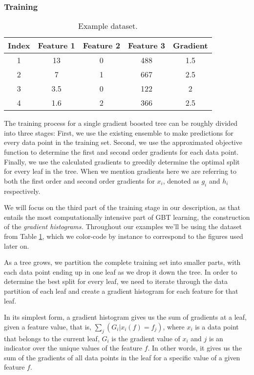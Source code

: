 \subsubsection*{Training}

\begin{table}
	\centering
	\begin{tabular}{cccc|c}
		\toprule
		Index & Feature 1 & Feature 2 & Feature 3 & Gradient \\
		\midrule
		\rowcolor{CBOne}
		1 & 13 & 0 & 488 & 1.5 \\
		\rowcolor{CBTwo}
		2 & 7 & 1 & 667 & 2.5 \\
		\rowcolor{CBThree}
		3 & 3.5 & 0 & 122 & 2 \\
		\rowcolor{CBFour}
		4 & 1.6 & 2 & 366 & 2.5 \\
		\bottomrule
	\end{tabular}
	\caption{Example dataset.}
	\label{tab:example-data}
\end{table}


The training process for a single gradient boosted tree can be roughly divided into three stages:
First, we use the existing ensemble to make predictions for every data point in the training
set. Second, we use the approximated objective function to determine the first and second order
gradients for each data point. Finally, we use the calculated gradients to greedily determine
the optimal split for every leaf in the tree. When we mention gradients here we are referring
to both the first order and second order gradients for $x_i$, denoted as $g_i$ and $h_i$
respectively.

We will focus on the third part of the training stage in our description, as that entails the most
computationally intensive part of GBT learning, the construction of the \emph{gradient histograms.}
Throughout our examples we'll be using the dataset from Table \ref{tab:example-data},
which we color-code by instance to correspond to the figures used later on.

As a tree grows, we partition the complete training set into smaller parts, with each data
point ending up in one leaf as we drop it down the tree.
In order to determine the best split for every leaf, we need to iterate through the data
partition of each leaf and create a gradient histogram for each feature for that leaf.

In its simplest form, a gradient histogram gives us the sum of gradients at a leaf,
given a feature value, that is, $\sum_{j}(G_i | x_i(f) = f_j)$, where $x_i$ is a data point
that belongs to the current leaf,  $G_i$ is the gradient value of $x_i$ and $j$ is an
indicator over the unique values of the feature $f$. In other words, it gives us the
sum of the gradients of all data points in the leaf for a specific value of a given
feature $f$.

